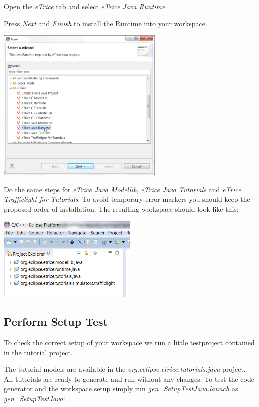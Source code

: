 Open the \emph{eTrice} tab and select \textit{eTrice Java Runtime}

Press \emph{Next} and \emph{Finish} to install the Runtime into your workspace.

\includegraphics[width=0.6\textwidth]{images/013-SetupWorkspace03.png}

Do the same steps for \textit{eTrice Java Modellib}, \textit{eTrice Java Tutorials} and \textit{eTrice Trafficlight for Tutorials}. To avoid temporary 
error markers you should keep the proposed order of installation. The resulting workspace should look like 
this:

\includegraphics[width=0.5\textwidth]{images/013-SetupWorkspace04.png}

\subsection{Perform Setup Test}

To check the correct setup of your workspace we run a little testproject contained in the tutorial project.

The tutorial models are available in the \textit{org.eclipse.etrice.tutorials.java} project. All tutorials are 
ready to generate and run without any changes. To test the code generator and the workspace setup simply run 
\emph{gen\_SetupTestJava.launch} as \emph{gen\_SetupTestJava}: 

